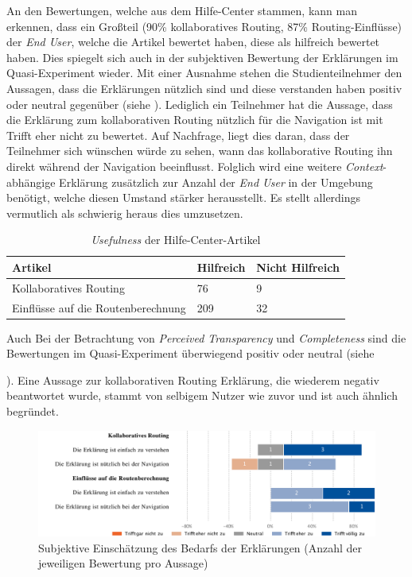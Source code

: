 An den Bewertungen, welche aus dem Hilfe-Center stammen, kann man erkennen, dass ein Großteil (90\% kollaboratives Routing, 87\% Routing-Einflüsse) der \textit{End User}, welche die Artikel bewertet haben, diese als \glqq hilfreich\grqq{} bewertet haben. Dies spiegelt sich auch in der subjektiven Bewertung der Erklärungen im Quasi-Experiment wieder. Mit einer Ausnahme stehen die Studienteilnehmer den Aussagen, dass die Erklärungen nützlich sind und diese verstanden haben positiv oder neutral gegenüber (siehe %
). Lediglich ein Teilnehmer hat die Aussage, dass die Erklärung zum kollaborativen Routing nützlich für die Navigation ist mit \glqq Trifft eher nicht zu\grqq{} bewertet. Auf Nachfrage, liegt dies daran, dass der Teilnehmer sich wünschen würde zu sehen, wann das kollaborative Routing ihn direkt während der Navigation beeinflusst. Folglich wird eine weitere \textit{Context}-abhängige Erklärung zusätzlich zur Anzahl der \textit{End User} in der Umgebung benötigt, welche diesen Umstand stärker herausstellt. Es stellt allerdings vermutlich als schwierig heraus dies umzusetzen.

\begin{table}[htb!]
    \centering
    \begin{tabular}{p{}p{}p{}}
        \hline
        Artikel & Hilfreich & Nicht Hilfreich \\
        \toprule
        Kollaboratives Routing & 76 & 9 \\
        Einflüsse auf die Routenberechnung & 209 & 32 \\
        \bottomrule
    \end{tabular}
    \caption{\textit{Usefulness} der Hilfe-Center-Artikel}
    \label{tab:explanation_results_clicked}
\end{table}

Auch Bei der Betrachtung von \textit{Perceived Transparency} und \textit{Completeness} sind die Bewertungen im Quasi-Experiment überwiegend positiv oder neutral (siehe %

). Eine Aussage zur kollaborativen Routing Erklärung, die wiederem negativ beantwortet wurde, stammt von selbigem Nutzer wie zuvor und ist auch ähnlich begründet.

\begin{figure}[htb!]
    \centering
    \includegraphics[width=\textwidth]{contents/06_model_evaluation/02_evaluation/res/qualitativeFeedback-evaluation_usefulness_qualitative.pdf}
    \caption{Subjektive Einschätzung des Bedarfs der Erklärungen (Anzahl der jeweiligen Bewertung pro Aussage)}
    \label{fig:evaluation_usefulness_qualitative}
\end{figure}

